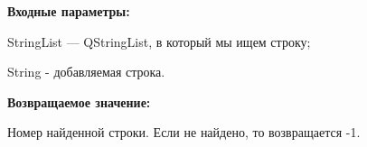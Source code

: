 \textbf{Входные параметры:}
 
StringList --- QStringList, в который мы ищем строку;

String - добавляемая строка.

\textbf{Возвращаемое значение:}

Номер найденной строки. Если не найдено, то возвращается -1.